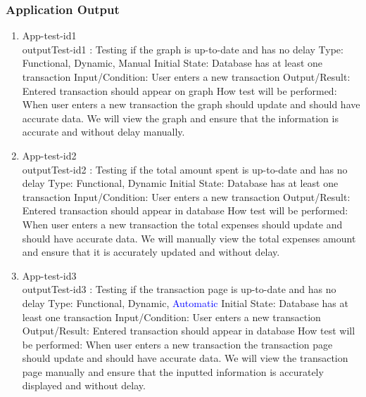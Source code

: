 \documentclass[12pt, titlepage]{article}
\begin{document}
\subsubsection{Application Output}
\begin{enumerate}
\item{App-test-id1\\}
outputTest-id1 : Testing if the graph is up-to-date and has no delay
\newline
Type: Functional, Dynamic, Manual
\newline
Initial State: Database has at least one transaction
\newline
Input/Condition: User enters a new transaction
\newline
Output/Result: Entered transaction should appear on graph
\newline
How test will be performed: When user enters a new transaction the graph should update and should have accurate data. We will view the graph and ensure that the information is accurate and without delay manually.

\item{App-test-id2\\}
outputTest-id2 : Testing if the total amount spent is up-to-date and has no delay
\newline
Type: Functional, Dynamic
\newline
Initial State: Database has at least one transaction
\newline
Input/Condition: User enters a new transaction
\newline
Output/Result: Entered transaction should appear in database
\newline
How test will be performed: When user enters a new transaction the total expenses should update and should have accurate data. We will manually view the total expenses amount and ensure that it is accurately updated and without delay.

\item{App-test-id3\\}
outputTest-id3 : Testing if the transaction page is up-to-date and has no delay
\newline
Type: Functional, Dynamic, \textcolor{blue}{Automatic}
\newline
Initial State: Database has at least one transaction
\newline
Input/Condition: User enters a new transaction
\newline
Output/Result: Entered transaction should appear in database
\newline
How test will be performed: When user enters a new transaction the transaction page should update and should have accurate data.  We will view the transaction page manually and ensure that the inputted information is accurately displayed and without delay.

\end{enumerate}
\end{document}
